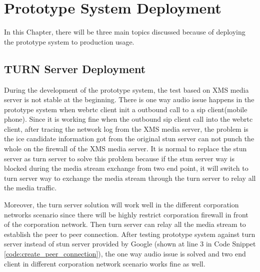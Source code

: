 \chapter{Prototype System Deployment}
\label{chp:sys_deploy}

\noindent In this Chapter, there will be three main topics discussed because of deploying the prototype system to production usage.

\section{TURN Server Deployment}

\par During the development of the prototype system, the test based on XMS media server is not stable at the beginning. There is one way audio issue happens in the prototype system when \gls{webrtc} client init a outbound call to a \gls{sip} client(mobile phone). Since it is working fine when the outbound \gls{sip} client call into the \gls{webrtc} client, after tracing the network log from the XMS media server, the problem is the \gls{ice} candidate information got from the original \gls{stun} server can not punch the whole on the firewall of the XMS media server. It is normal to replace the \gls{stun} server as \gls{turn} server to solve this problem because if the \gls{stun} server way is blocked during the media stream exchange from two end point, it will switch to \gls{turn} server way to exchange the media stream through the \gls{turn} server to relay all the media traffic.

\par Moreover, the \gls{turn} server solution will work well in the different corporation networks scenario since there will be highly restrict corporation firewall in front of the corporation network. Then \gls{turn} server can relay all the media stream to establish the peer to peer connection. After testing prototype system against \gls{turn} server instead of \gls{stun} server provided by Google (shown at line 3 in Code Snippet \ref{code:create_peer_connection}), the one way audio issue is solved and two end client in different corporation network scenario works fine as well.


